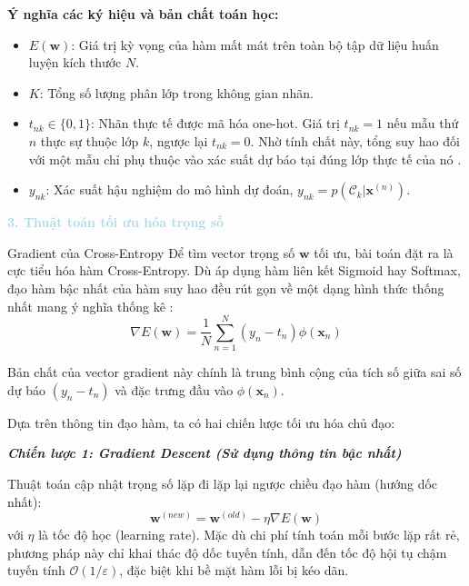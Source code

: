 \vspace{0.5em}
\noindent\textbf{Ý nghĩa các ký hiệu và bản chất toán học:}
\begin{itemize}
    \item $E(\mathbf{w})$: Giá trị kỳ vọng của hàm mất mát trên toàn bộ tập dữ liệu huấn luyện kích thước $N$.
    \item $K$: Tổng số lượng phân lớp trong không gian nhãn.
    \item $t_{nk} \in \{0, 1\}$: Nhãn thực tế được mã hóa one-hot. Giá trị $t_{nk} = 1$ nếu mẫu thứ $n$ thực sự thuộc lớp $k$, ngược lại $t_{nk} = 0$. Nhờ tính chất này, tổng suy hao đối với một mẫu chỉ phụ thuộc vào xác suất dự báo tại đúng lớp thực tế của nó \cite{zhang2021dive}.
    \item $y_{nk}$: Xác suất hậu nghiệm do mô hình dự đoán, $y_{nk} = p(\mathcal{C}_k | \mathbf{x}^{(n)})$.
\end{itemize}

\vspace{0.5em}
\noindent\textcolor{lightblue}{\textbf{3. Thuật toán tối ưu hóa trọng số}}
\vspace{0.5em}

\begin{importantbox}{Gradient của Cross-Entropy}
Để tìm vector trọng số $\mathbf{w}$ tối ưu, bài toán đặt ra là cực tiểu hóa hàm Cross-Entropy. Dù áp dụng hàm liên kết Sigmoid hay Softmax, đạo hàm bậc nhất của hàm suy hao đều rút gọn về một dạng hình thức thống nhất mang ý nghĩa thống kê \cite{bishop2006pattern}:
\begin{equation}
    \nabla E(\mathbf{w}) = \frac{1}{N} \sum_{n=1}^N (y_{n} - t_{n}) \phi(\mathbf{x}_n)
\end{equation}

Bản chất của vector gradient này chính là trung bình cộng của tích số giữa sai số dự báo $(y_n - t_n)$ và đặc trưng đầu vào $\phi(\mathbf{x}_n)$.
\end{importantbox}

Dựa trên thông tin đạo hàm, ta có hai chiến lược tối ưu hóa chủ đạo:

\vspace{0.5em}
\noindent\textit{\textbf{Chiến lược 1: Gradient Descent (Sử dụng thông tin bậc nhất)}}

Thuật toán cập nhật trọng số lặp đi lặp lại ngược chiều đạo hàm (hướng dốc nhất):
\begin{equation}
    \mathbf{w}^{(new)} = \mathbf{w}^{(old)} - \eta \nabla E(\mathbf{w})
\end{equation}
với $\eta$ là tốc độ học (learning rate). Mặc dù chi phí tính toán mỗi bước lặp rất rẻ, phương pháp này chỉ khai thác độ dốc tuyến tính, dẫn đến tốc độ hội tụ chậm tuyến tính $\mathcal{O}(1/\varepsilon)$, đặc biệt khi bề mặt hàm lỗi bị kéo dãn.

